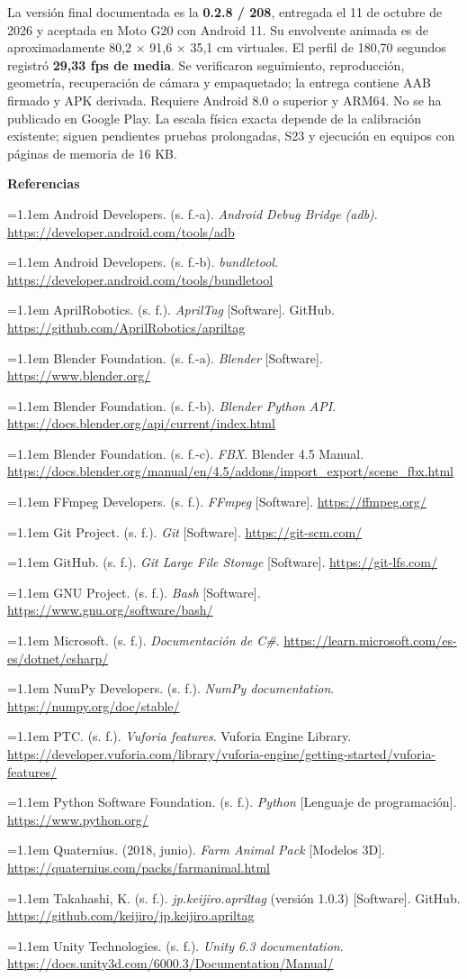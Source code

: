\documentclass[11pt,letterpaper]{article}
\newcommand{\refentry}[1]{\par\begingroup\hangindent=1.1em\hangafter=1 #1\par\endgroup}
\begin{document}
La versión final documentada es la \textbf{0.2.8 / 208}, entregada el 11 de octubre de 2026 y aceptada en Moto G20 con Android 11. Su envolvente animada es de aproximadamente 80,2 × 91,6 × 35,1 cm virtuales. El perfil de 180,70 segundos registró \textbf{29,33 fps de media}. Se verificaron seguimiento, reproducción, geometría, recuperación de cámara y empaquetado; la entrega contiene AAB firmado y APK derivada. Requiere Android 8.0 o superior y ARM64. No se ha publicado en Google Play. La escala física exacta depende de la calibración existente; siguen pendientes pruebas prolongadas, S23 y ejecución en equipos con páginas de memoria de 16 KB.

\vspace{3pt}
{\sffamily\bfseries\fontsize{13}{17}\selectfont Referencias\par}
\vspace{3pt}
\begingroup
\fontsize{9}{11.4}\selectfont
\setlength{\parskip}{4pt}
\refentry{Android Developers. (s. f.-a). \textit{Android Debug Bridge (adb)}. \url{https://developer.android.com/tools/adb}}
\refentry{Android Developers. (s. f.-b). \textit{bundletool}. \url{https://developer.android.com/tools/bundletool}}
\refentry{AprilRobotics. (s. f.). \textit{AprilTag} [Software]. GitHub. \url{https://github.com/AprilRobotics/apriltag}}
\refentry{Blender Foundation. (s. f.-a). \textit{Blender} [Software]. \url{https://www.blender.org/}}
\refentry{Blender Foundation. (s. f.-b). \textit{Blender Python API}. \url{https://docs.blender.org/api/current/index.html}}
\refentry{Blender Foundation. (s. f.-c). \textit{FBX}. Blender 4.5 Manual. \url{https://docs.blender.org/manual/en/4.5/addons/import_export/scene_fbx.html}}
\refentry{FFmpeg Developers. (s. f.). \textit{FFmpeg} [Software]. \url{https://ffmpeg.org/}}
\refentry{Git Project. (s. f.). \textit{Git} [Software]. \url{https://git-scm.com/}}
\refentry{GitHub. (s. f.). \textit{Git Large File Storage} [Software]. \url{https://git-lfs.com/}}
\refentry{GNU Project. (s. f.). \textit{Bash} [Software]. \url{https://www.gnu.org/software/bash/}}
\refentry{Microsoft. (s. f.). \textit{Documentación de C\#}. \url{https://learn.microsoft.com/es-es/dotnet/csharp/}}
\refentry{NumPy Developers. (s. f.). \textit{NumPy documentation}. \url{https://numpy.org/doc/stable/}}
\refentry{PTC. (s. f.). \textit{Vuforia features}. Vuforia Engine Library.\\\url{https://developer.vuforia.com/library/vuforia-engine/getting-started/vuforia-features/}}
\refentry{Python Software Foundation. (s. f.). \textit{Python} [Lenguaje de programación]. \url{https://www.python.org/}}
\refentry{Quaternius. (2018, junio). \textit{Farm Animal Pack} [Modelos 3D]. \url{https://quaternius.com/packs/farmanimal.html}}
\refentry{Takahashi, K. (s. f.). \textit{jp.keijiro.apriltag} (versión 1.0.3) [Software]. GitHub. \url{https://github.com/keijiro/jp.keijiro.apriltag}}
\refentry{Unity Technologies. (s. f.). \textit{Unity 6.3 documentation}. \url{https://docs.unity3d.com/6000.3/Documentation/Manual/}}
\endgroup
\end{document}
